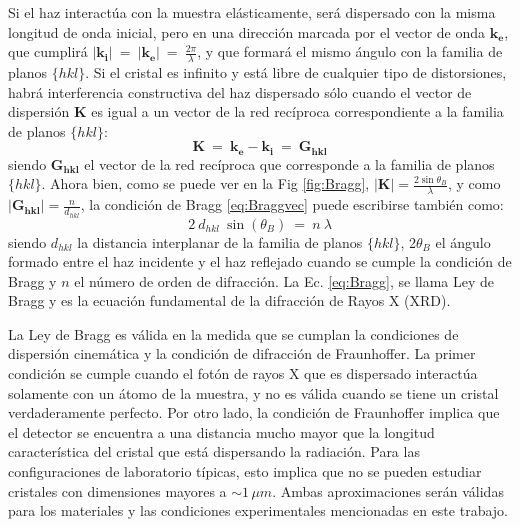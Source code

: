Si el haz interactúa con la muestra elásticamente, será dispersado con la misma longitud de onda inicial, pero en una dirección marcada por el vector de onda $\mathbf{k_e}$, que cumplirá $\lvert \mathbf{k_i} \rvert \ = \ \lvert \mathbf{k_e} \rvert \ = \ \frac{2\pi}{\lambda}$, y que formará el mismo ángulo con la familia de planos $\{hkl\}$.
Si el cristal es infinito y está libre de cualquier tipo de distorsiones, habrá interferencia constructiva del haz dispersado sólo cuando el vector de dispersión $\mathbf{K}$ es igual a un vector de la red recíproca correspondiente a la familia de planos $\{hkl\}$:
\begin{equation}
  \mathbf{K} \ = \ \mathbf{k_e} - \mathbf{k_i} \ = \ \mathbf{G_{hkl}}
  \label{eq:Braggvec}
\end{equation}
\noindent
siendo $\mathbf{G_{hkl}}$ el vector de la red recíproca que corresponde a la familia de planos $\{hkl\}$.
Ahora bien, como se puede ver en la Fig \ref{fig:Bragg}, $\displaystyle \lvert \mathbf{K} \rvert = \frac{2\sin\theta_B}{\lambda}$, y como $\displaystyle\lvert \mathbf{G_{hkl}} \rvert = \frac{n}{d_{hkl}}$, la condición de Bragg \ref{eq:Braggvec} puede escribirse también como:
\begin{equation}
  2 \ d_{hkl} \ \sin(\theta_{B}) \ = \ n \ \lambda
  \label{eq:Bragg}
\end{equation}
\noindent
siendo $d_{hkl}$ la distancia interplanar de la familia de planos $\{hkl\}$, 2$\theta_{B}$ el ángulo formado entre el haz incidente y el haz reflejado cuando se cumple la condición de Bragg y $n$ el número de orden de difracción. La Ec. \ref{eq:Bragg}, se llama Ley de Bragg y es la ecuación fundamental de la difracción de Rayos X (XRD). 

La Ley de Bragg es válida en la medida que se cumplan la condiciones de dispersión cinemática y la condición de difracción de Fraunhoffer. 
La primer condición se cumple cuando el fotón de rayos X que es dispersado interactúa solamente con un átomo de la muestra, y no es válida cuando se tiene un cristal verdaderamente perfecto.
Por otro lado, la condición de Fraunhoffer implica que el detector se encuentra a una distancia mucho mayor que la longitud característica del cristal que está dispersando la radiación.
Para las configuraciones de laboratorio típicas, esto implica que no se pueden estudiar cristales con dimensiones mayores a $\sim 1\,\mu m$.
Ambas aproximaciones serán válidas para los materiales y las condiciones experimentales mencionadas en este trabajo.



